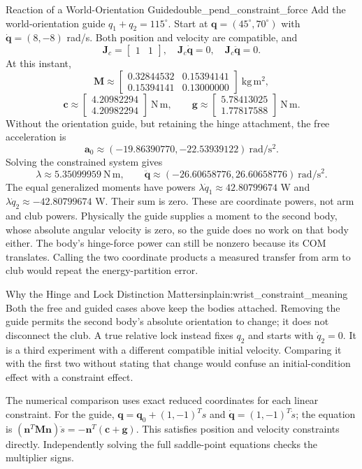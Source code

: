 \begin{example}{Reaction of a World-Orientation Guide}{double_pend_constraint_force}
Add the world-orientation guide $q_1+q_2=115^\circ$. Start at $\bm q=(45^\circ,70^\circ)$ with $\dot{\bm q}=(8,-8)$ rad/s. Both position and velocity are compatible, and
\begin{equation}
\bm J_c=\begin{bmatrix}1&1\end{bmatrix},\quad
\bm J_c\dot{\bm q}=0,\quad \bm J_c\ddot{\bm q}=0.
\label{eq:constraint_consistency_wrist}
\end{equation}
At this instant,
\[
\bm M\approx\begin{bmatrix}0.32844532&0.15394141\\0.15394141&0.13000000\end{bmatrix}\ \mathrm{kg\,m^2},
\]
\[
\bm c\approx\begin{bmatrix}4.20982294\\4.20982294\end{bmatrix}\ \mathrm{N\,m},
\qquad
\bm g\approx\begin{bmatrix}5.78413025\\1.77817588\end{bmatrix}\ \mathrm{N\,m}.
\]
Without the orientation guide, but retaining the hinge attachment, the free acceleration is
\[
\bm a_0\approx(-19.86390770,-22.53939122)\ \mathrm{rad/s^2}.
\]
Solving the constrained system gives
\[
\lambda\approx5.35099959\ \mathrm{N\,m},\qquad
\ddot{\bm q}\approx(-26.60658776,26.60658776)\ \mathrm{rad/s^2}.
\]
The equal generalized moments have powers $\lambda\dot q_1\approx42.80799674$ W and $\lambda\dot q_2\approx-42.80799674$ W. Their sum is zero. These are coordinate powers, not arm and club powers. Physically the guide supplies a moment to the second body, whose absolute angular velocity is zero, so the guide does no work on that body either. The body's hinge-force power can still be nonzero because its COM translates. Calling the two coordinate products a measured transfer from arm to club would repeat the energy-partition error.
\end{example}

\begin{laymansbox}{Why the Hinge and Lock Distinction Matters}{inplain:wrist_constraint_meaning}
Both the free and guided cases above keep the bodies attached. Removing the guide permits the second body's absolute orientation to change; it does not disconnect the club. A true relative lock instead fixes $q_2$ and starts with $\dot q_2=0$. It is a third experiment with a different compatible initial velocity. Comparing it with the first two without stating that change would confuse an initial-condition effect with a constraint effect.

The numerical comparison uses exact reduced coordinates for each linear constraint. For the guide, $\bm q=\bm q_0+(1,-1)^Ts$ and $\dot{\bm q}=(1,-1)^T\dot s$; the equation is $(\bm n^T\bm M\bm n)\ddot s=-\bm n^T(\bm c+\bm g)$. This satisfies position and velocity constraints directly. Independently solving the full saddle-point equations checks the multiplier signs.
\end{laymansbox}

